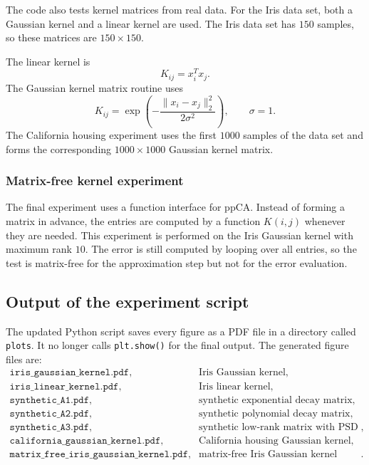 The code also tests kernel matrices from real data. For the Iris data set, both a Gaussian kernel and a linear kernel are used. The Iris data set has $150$ samples, so these matrices are $150 \times 150$.

The linear kernel is
\[
  K_{ij} = x_i^T x_j .
\]
The Gaussian kernel matrix routine uses
\[
  K_{ij}
  =
  \exp\!\left(-\frac{\|x_i-x_j\|_2^2}{2\sigma^2}\right),
  \qquad \sigma = 1 .
\]
The California housing experiment uses the first $1000$ samples of the data set and forms the corresponding $1000 \times 1000$ Gaussian kernel matrix.

\subsubsection*{Matrix-free kernel experiment}

The final experiment uses a function interface for ppCA. Instead of forming a matrix in advance, the entries are computed by a function $K(i,j)$ whenever they are needed. This experiment is performed on the Iris Gaussian kernel with maximum rank $10$. The error is still computed by looping over all entries, so the test is matrix-free for the approximation step but not for the error evaluation.

\subsection{Output of the experiment script}

The updated Python script saves every figure as a PDF file in a directory called \texttt{plots}. It no longer calls \texttt{plt.show()} for the final output. The generated figure files are:
\[
\begin{array}{ll}
\texttt{iris\_gaussian\_kernel.pdf}, & \text{Iris Gaussian kernel}, \\
\texttt{iris\_linear\_kernel.pdf}, & \text{Iris linear kernel}, \\
\texttt{synthetic\_A1.pdf}, & \text{synthetic exponential decay matrix}, \\
\texttt{synthetic\_A2.pdf}, & \text{synthetic polynomial decay matrix}, \\
\texttt{synthetic\_A3.pdf}, & \text{synthetic low-rank matrix with PSD noise}, \\
\texttt{california\_gaussian\_kernel.pdf}, & \text{California housing Gaussian kernel}, \\
\texttt{matrix\_free\_iris\_gaussian\_kernel.pdf}, & \text{matrix-free Iris Gaussian kernel experiment}.
\end{array}
\]

